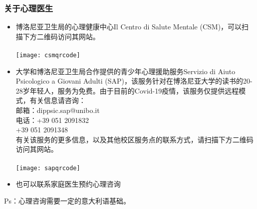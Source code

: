 \subsubsection{关于心理医生}
\begin{itemize}
\item	博洛尼亚卫生局的心理健康中心Il Centro di Salute Mentale (CSM)，可以扫描下方二维码访问其网站。\\
\\
\texttt{[image: csmqrcode]}\\
\item	大学和博洛尼亚卫生局合作提供的青少年心理援助服务Servizio di Aiuto Psicologico a Giovani Adulti (SAP)，该服务针对在博洛尼亚大学的读书的20-28岁年轻人，服务为免费。由于目前的Covid-19疫情，该服务仅提供远程模式，有关信息请咨询：\\
邮箱：dippsic.sap@unibo.it\\
电话：+39 051 2091832\\
+39 051 2091348\\
有关该服务的更多信息，以及其他校区服务点的联系方式，请扫描下方二维码访问其网站。\\
\\
\texttt{[image: sapqrcode]}\\
\item	也可以联系家庭医生预约心理咨询
\end{itemize}
Ps：心理咨询需要一定的意大利语基础。


